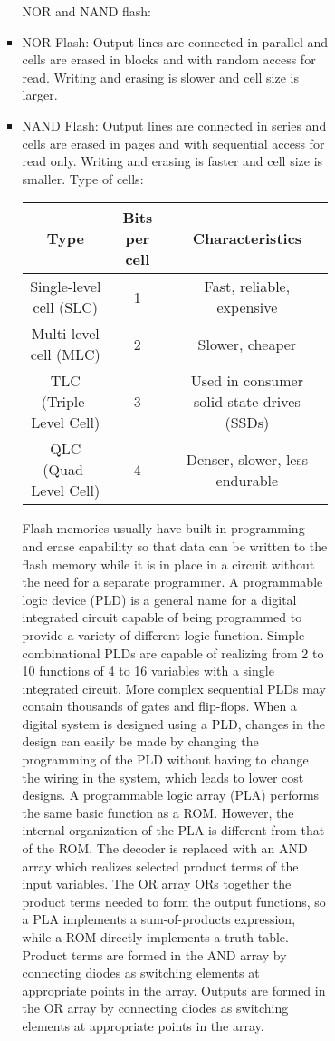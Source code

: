 \documentclass[a4paper,12pt]{article}
\begin{document}
\begin{itemize}
\begin{itemize}
\begin{itemize}
\begin{itemize}
\begin{itemize}
\begin{itemize}
\begin{itemize}
NOR and NAND flash:
\bit
\item NOR Flash: Output lines are connected in parallel and cells are erased in blocks and with random access for read. Writing and erasing is slower and cell size is larger.
\item NAND Flash: Output lines are connected in series and cells are erased in pages and with sequential access for read only. Writing and erasing is faster and cell size is smaller.
\eit
Type of cells:
\begin{longtable}[c]{|c|c|c|}
\hline
Type & Bits per cell & Characteristics \\\hline
Single-level cell (SLC) & 1 & Fast, reliable, expensive \\\hline
Multi-level cell (MLC) & 2 & Slower, cheaper \\\hline
TLC (Triple-Level Cell) & 3 & Used in consumer solid-state drives (SSDs) \\\hline
QLC (Quad-Level Cell) & 4 & Denser, slower, less endurable \\\hline
\end{longtable}
Flash memories usually have built-in programming and erase capability so that data can be written to the flash memory while it is in place in a circuit without the need for a separate programmer.
A programmable logic device (PLD) is a general name for a digital integrated circuit capable of being programmed to provide a variety of different logic function. Simple combinational PLDs are capable of realizing from 2 to 10 functions of 4 to 16 variables with a single integrated circuit. More complex sequential PLDs may contain thousands of gates and flip-flops. When a digital system is designed using a PLD, changes in the design can easily be made by changing the programming of the PLD without having to change the wiring in the system, which leads to lower cost designs.
A programmable logic array (PLA) performs the same basic function as a ROM. However, the internal organization of the PLA is different from that of the ROM. The decoder is replaced with an AND array which realizes selected product terms of the input variables. The OR array ORs together the product terms needed to form the output functions, so a PLA implements a sum-of-products expression, while a ROM directly implements a truth table. Product terms are formed in the AND array by connecting diodes as switching elements at appropriate points in the array. Outputs are formed in the OR array by connecting diodes as switching elements at appropriate points in the array.


\end{itemize}
\end{itemize}
\end{itemize}
\end{itemize}
\end{itemize}
\end{itemize}
\end{itemize}
\end{document}
